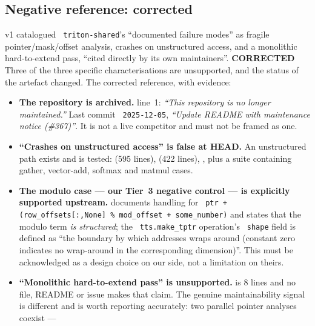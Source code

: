 \documentclass[11pt,a4paper]{article}
\newcommand{\code}[1]{\texttt{\small\hyphenchar\font=45 #1}}
\newcommand{\falsified}{\textbf{\textcolor{red!75!black}{CORRECTED}}}
\begin{document}
\subsection{Negative reference: corrected}\label{sec:negative}

v1 catalogued \code{triton-shared}'s ``documented failure modes'' as fragile pointer/mask/offset analysis,
crashes on unstructured access, and a monolithic hard-to-extend pass, ``cited directly by its own
maintainers''. \falsified{} Three of the three specific characterisations are unsupported, and the status of
the artefact changed. The corrected reference, with evidence:

\begin{itemize}[leftmargin=1.3em,itemsep=0.4em]
\item \textbf{The repository is archived.}  line~1: \emph{``This repository is no longer
      maintained.''} Last commit \code{2025-12-05}, \emph{``Update README with maintenance notice (\#367)''}.
      It is not a live competitor and must not be framed as one.
\item \textbf{``Crashes on unstructured access'' is false at HEAD.} An unstructured path exists and is tested:
       (595 lines),
       (422 lines),
      , plus a  suite
      containing gather, vector-add, softmax and matmul cases.
\item \textbf{The modulo case --- our Tier~3 negative control --- is explicitly supported upstream.}
       documents handling for
      \code{ptr + (row\_offsets[:,None] \% mod\_offset + some\_number)} and states that the modulo term
      \emph{is structured}; the \code{tts.make\_tptr} operation's \code{shape} field is defined as ``the
      boundary by which addresses wraps around (constant zero indicates no wrap-around in the corresponding
      dimension)''. This must be acknowledged as a design choice on our side, not a limitation on theirs.
\item \textbf{``Monolithic hard-to-extend pass'' is unsupported.}  is 8 lines and no
      file, README or issue makes that claim. The genuine maintainability signal is different and is worth
      reporting accurately: two parallel pointer analyses coexist --- 

\end{itemize}
\end{document}
